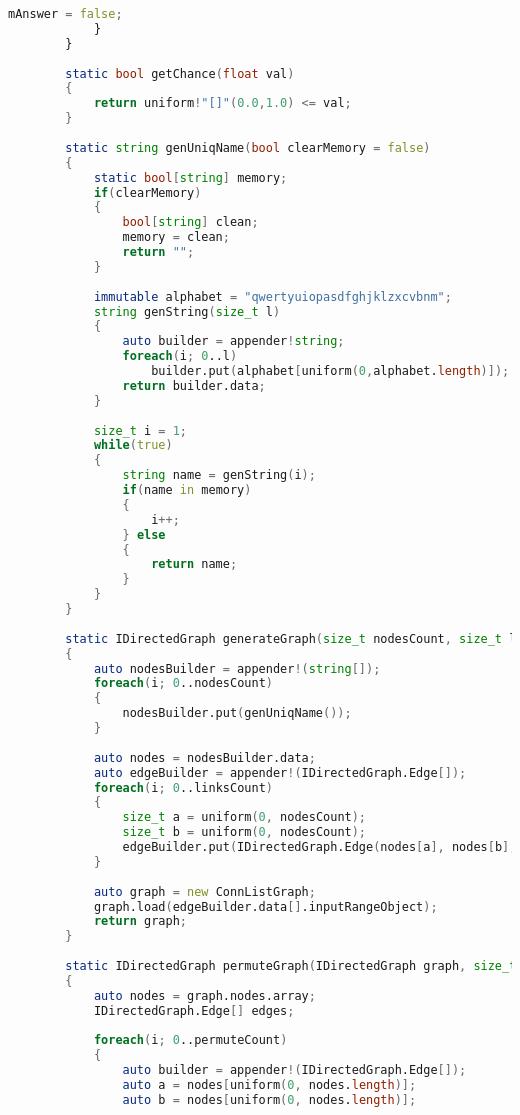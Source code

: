 \documentclass[russian,utf8,emptystyle]{eskdtext}
\begin{document}
\begin{lstlisting}[language=D]
                mAnswer = false;
            }
        }
        
        static bool getChance(float val)
        {
            return uniform!"[]"(0.0,1.0) <= val;
        }
        
        static string genUniqName(bool clearMemory = false)
        {
            static bool[string] memory;
            if(clearMemory)
            {
                bool[string] clean;
                memory = clean;
                return "";
            }
            
            immutable alphabet = "qwertyuiopasdfghjklzxcvbnm";
            string genString(size_t l)
            {
                auto builder = appender!string;
                foreach(i; 0..l)
                    builder.put(alphabet[uniform(0,alphabet.length)]);
                return builder.data;
            }
            
            size_t i = 1;
            while(true)
            {
                string name = genString(i);
                if(name in memory)
                {
                    i++;
                } else
                {
                    return name;
                }
            }
        }
        
        static IDirectedGraph generateGraph(size_t nodesCount, size_t linksCount)
        {
            auto nodesBuilder = appender!(string[]);
            foreach(i; 0..nodesCount)
            {
                nodesBuilder.put(genUniqName());
            }
            
            auto nodes = nodesBuilder.data;
            auto edgeBuilder = appender!(IDirectedGraph.Edge[]);
            foreach(i; 0..linksCount)
            {
                size_t a = uniform(0, nodesCount);
                size_t b = uniform(0, nodesCount);
                edgeBuilder.put(IDirectedGraph.Edge(nodes[a], nodes[b], ""));
            }
            
            auto graph = new ConnListGraph;
            graph.load(edgeBuilder.data[].inputRangeObject);
            return graph;
        }
        
        static IDirectedGraph permuteGraph(IDirectedGraph graph, size_t permuteCount)
        {
            auto nodes = graph.nodes.array;
            IDirectedGraph.Edge[] edges;
            
            foreach(i; 0..permuteCount)
            {
                auto builder = appender!(IDirectedGraph.Edge[]);
                auto a = nodes[uniform(0, nodes.length)];
                auto b = nodes[uniform(0, nodes.length)];
                

\end{lstlisting}
\end{document}

